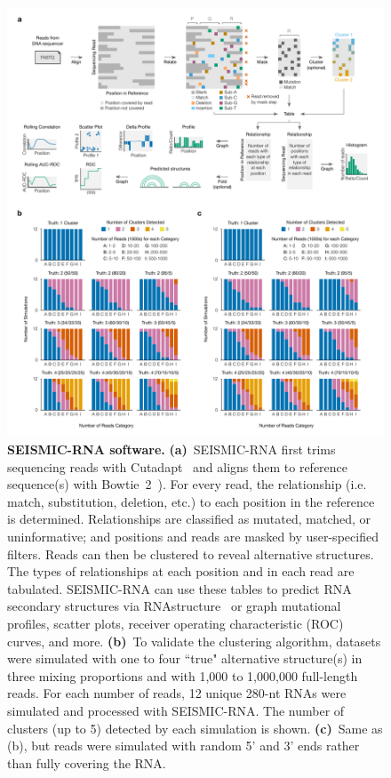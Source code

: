 \documentclass[main.tex]{subfiles}
\begin{document}
\begin{figure}[H]
	\includegraphics[width=\textwidth]{../MainFigures/seismic-wf/seismic-wf.pdf}
	\caption{\textbf{SEISMIC-RNA software.} \textbf{(a)}~SEISMIC-RNA first trims sequencing reads with Cutadapt~\cite{Martin2011} and aligns them to reference sequence(s) with Bowtie~2~\cite{Langmead2012}). For every read, the relationship (i.e. match, substitution, deletion, etc.) to each position in the reference is determined. Relationships are classified as mutated, matched, or uninformative; and positions and reads are masked by user-specified filters. Reads can then be clustered to reveal alternative structures. The types of relationships at each position and in each read are tabulated. SEISMIC-RNA can use these tables to predict RNA secondary structures via RNAstructure~\cite{Reuter2010,Cordero2012} or graph mutational profiles, scatter plots, receiver operating characteristic (ROC) curves, and more. \textbf{(b)}~To validate the clustering algorithm, datasets were simulated with one to four ``true" alternative structure(s) in three mixing proportions and with 1,000 to 1,000,000 full-length reads. For each number of reads, 12 unique 280-nt RNAs were simulated and processed with SEISMIC-RNA. The number of clusters (up to 5) detected by each simulation is shown. \textbf{(c)}~Same as (b), but reads were simulated with random 5' and 3' ends rather than fully covering the RNA.}
	\label{seismic-wf}
\end{figure}
\end{document}
